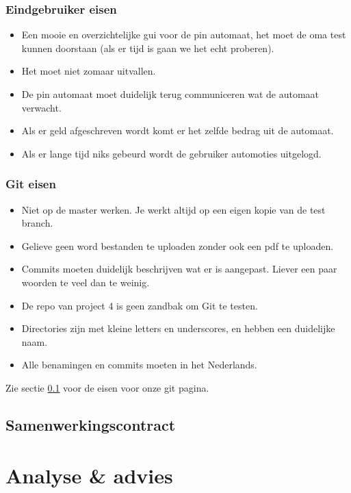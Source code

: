 \documentclass{article}
\begin{document}
\subsubsection{Eindgebruiker eisen}
\begin{itemize}
	\item Een mooie en overzichtelijke gui voor de pin automaat, het moet de oma test kunnen 	doorstaan (als er tijd is gaan we het echt proberen).
	\item Het moet niet zomaar uitvallen.
	\item De pin automaat moet duidelijk terug communiceren wat de automaat verwacht.
	\item Als er geld afgeschreven wordt komt er het zelfde bedrag uit de automaat.
	\item Als er lange tijd niks gebeurd wordt de gebruiker automoties uitgelogd.
\end{itemize}
\subsubsection{Git eisen}
\begin{itemize}
	\item Niet op de master werken. Je werkt altijd op een eigen kopie van de test branch.
	\item Gelieve geen word bestanden te uploaden zonder ook een pdf te uploaden.
	\item Commits moeten duidelijk beschrijven wat er is aangepast. Liever een paar woorden te
veel dan te weinig.
	\item De repo van project 4 is geen zandbak om Git te testen.
	\item Directories zijn met kleine letters en underscores, en hebben een duidelijke naam.
	\item Alle benamingen en commits moeten in het Nederlands.
\end{itemize}

Zie sectie \ref{chap:Samenwerkingscontract} voor de eisen voor onze git pagina.

\subsection{Samenwerkingscontract}
\label{chap:Samenwerkingscontract}

\section{Analyse \& advies}
\end{document}
